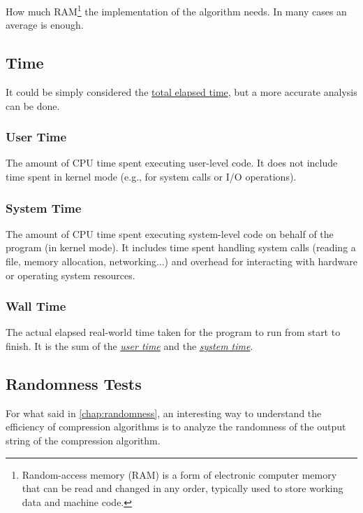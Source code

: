 \documentclass[12pt, a4paper]{report}
\begin{document}
How much RAM\footnote{Random-access memory (RAM) is a form of electronic computer memory that can be read and changed in any
order, typically used to store working data and machine code.} the implementation of the algorithm needs.
In many cases an average is enough.

\subsection{Time}

It could be simply considered the \hyperref[subsubsec:wall_time]{total elapsed time}, but a more accurate analysis can be done.

\subsubsection{User Time}
\label{subsubsec:user_time}

The amount of CPU time spent executing user-level code.
It does not include time spent in kernel mode (e.g., for system calls or I/O operations).

\subsubsection{System Time}
\label{subsubsec:system_time}

The amount of CPU time spent executing system-level code on behalf of the program (in kernel mode).
It includes time spent handling system calls (reading a file, memory allocation, networking...) and overhead for interacting with
hardware or operating system resources.

\subsubsection{Wall Time}
\label{subsubsec:wall_time}

The actual elapsed real-world time taken for the program to run from start to finish.
It is the sum of the \hyperref[subsubsec:user_time]{\textit{user time}} and the
\hyperref[subsubsec:system_time]{\textit{system time}}.

\subsection{Randomness Tests}

For what said in \autoref{chap:randomness}, an interesting way to understand the efficiency of compression algorithms is to
analyze the randomness of the output string of the compression algorithm.
\end{document}
